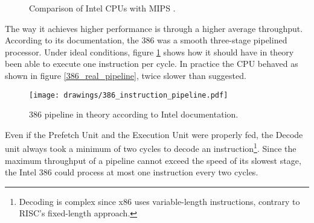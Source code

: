 \par
\begin{figure}[H]
\centering
   \caption{Comparison of Intel CPUs with MIPS \protect\footnotemark.}
 \end{figure}

The way it achieves higher performance is through a higher average throughput. According to its documentation, the 386 was a smooth three-stage pipelined processor. Under ideal conditions, figure \ref{386_doc_pipeline} shows how it should have in theory been able to execute one instruction per cycle. In practice the CPU behaved as shown in figure \ref{386_real_pipeline}, twice slower than suggested.

\begin{figure}[H]
\centering
\texttt{[image: drawings/386\_instruction\_pipeline.pdf]}
\caption{386 pipeline in theory according to Intel documentation.}
\label{386_doc_pipeline}
\end{figure}



\par
Even if the Prefetch Unit and the Execution Unit were properly fed, the Decode unit always took a minimum of two cycles to decode an instruction\footnote{Decoding is complex since x86 uses variable-length instructions, contrary to RISC's fixed-length approach.}. Since the maximum throughput of a pipeline cannot exceed the speed of its slowest stage, the Intel 386 could process at most one instruction every two cycles.\\
\par

